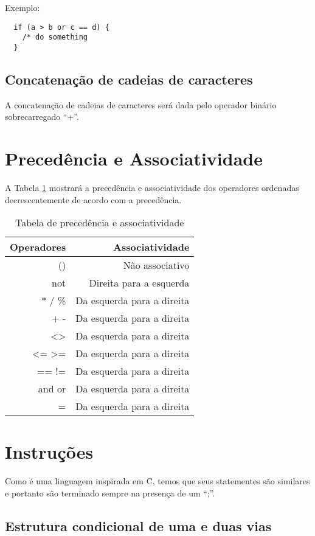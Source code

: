 \documentclass[a4paper, 12pt, article]{memoir}
\begin{document}
Exemplo:
\begin{lstlisting}
  if (a > b or c == d) {
    /* do something
  }
\end{lstlisting}

\subsection{Concatenação de cadeias de caracteres}
\label{subsec:concatenacao}
A concatenação de cadeias de caracteres será dada pelo operador binário sobrecarregado ``+''.

\section{Precedência e Associatividade}
\label{sec:precedencia}
A Tabela \ref{tab:precedencia} mostrará a precedência e associatividade dos
operadores ordenadas decrescentemente de acordo com a precedência.
\begin{table}[h]
  \centering
  \begin{tabular}{r|r}

    Operadores & Associatividade \\
    \hline
    () & Não associativo \\
    not & Direita para a esquerda \\
    $*$ / \% & Da esquerda para a direita\\
    + - & Da esquerda para a direita \\
	\textless \textgreater & Da esquerda para a direita \\
	\textless= \textgreater= & Da esquerda para a direita \\
    == != & Da esquerda para a direita \\
    and or & Da esquerda para a direita \\
    = & Da esquerda para a direita

  \end{tabular}
  \caption{Tabela de precedência e associatividade}
  \label{tab:precedencia}
\end{table}

\section{Instruções}
\label{sec:instrucoes}
Como é uma linguagem inspirada em C, temos que seus statementes são similares e portanto são terminado sempre na presença de um ``;''.

\subsection{Estrutura condicional de uma e duas vias}
\label{sub:estruturacondicional}
\end{document}

